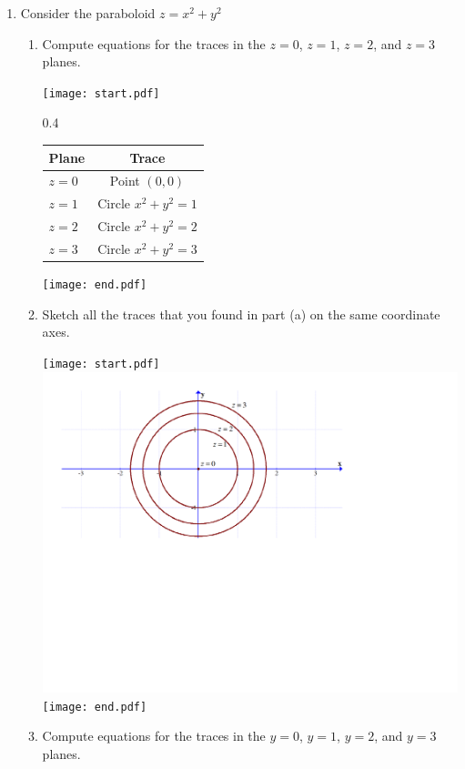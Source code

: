 \documentclass[12pt]{article}
\begin{document}
\begin{enumerate}
\begin{enumerate}
\end{enumerate}

\item Consider the paraboloid $z=x^2+y^2$

\begin{enumerate}

\item Compute equations for the traces in the $z=0$, $z=1$, $z=2$, and $z=3$ planes.

\texttt{[image: start.pdf]}
{{{0.4\linewidth}{\begin{center}
\begin{tabular}{l|c}
{\bf Plane} & {\bf Trace}\\
\hline
$z=0$ & Point $(0,0)$\\
$z=1$ & Circle $x^2+y^2=1$\\
$z=2$ & Circle $x^2+y^2=2$\\
$z=3$ & Circle $x^2+y^2=3$\\
\end{tabular}
\end{center}
}}}
\texttt{[image: end.pdf]}


\newpage

\item Sketch all the traces that you found in part (a) on the same coordinate axes.

\texttt{[image: start.pdf]}
{{\includegraphics[scale=0.4]{traces.pdf}}}
\texttt{[image: end.pdf]}


\item Compute equations for the traces in the $y=0$, $y=1$, $y=2$, and $y=3$ planes.


\end{enumerate}
\end{enumerate}
\end{document}
